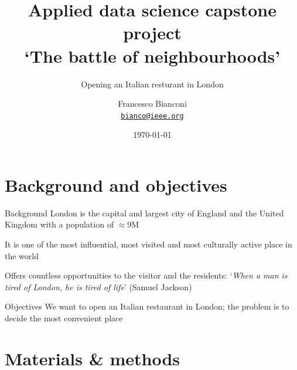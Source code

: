 \documentclass{beamer}
\title[Optional short paper title]
{Applied data science capstone project \\ `The battle of neighbourhoods'}
\subtitle
{Opening an Italian resturant in London}
\author
{Francesco Bianconi \\ \href{mailto:bianco@ieee.org}{\texttt{bianco@ieee.org}}}
\date{\today}
\begin{document}
\begin{frame}
  \titlepage
\end{frame}

\section{Background and objectives}

\begin{frame}{Background}
London is the capital and largest city of England and the United Kingdom with a population of $\approx$9M

It is one of the most influential, most visited and most culturally active place in the world

Offers countless opportunities to the visitor and the residents: `\emph{When a man is tired of London, he is tired of life}' (Samuel Jackson)
\end{frame}

\begin{frame}{Objectives}
We want to open an Italian restaurant in London; the problem is to decide the most convenient place
\end{frame}

\section{Materials \& methods}
\end{document}
